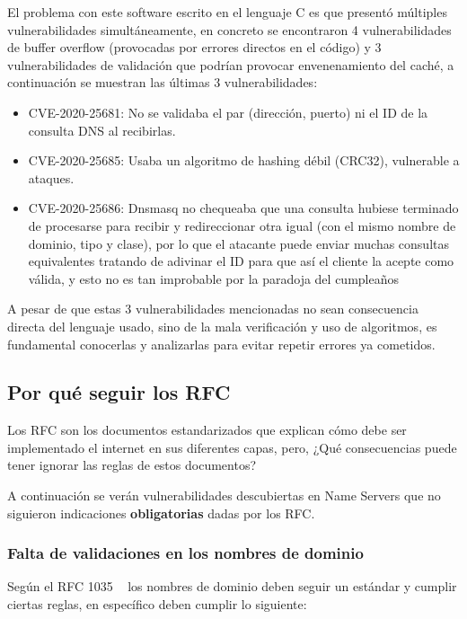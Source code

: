 El problema con este software escrito en el lenguaje C es que presentó múltiples vulnerabilidades simultáneamente, en concreto se encontraron 4 
vulnerabilidades de buffer overflow (provocadas por errores directos en el código) y 3 vulnerabilidades de validación que podrían provocar 
envenenamiento del caché, a continuación se muestran las últimas 3 vulnerabilidades:

\begin{itemize}
\item CVE-2020-25681: No se validaba el par (dirección, puerto) ni el ID de la consulta DNS al recibirlas.
\item CVE-2020-25685: Usaba un algoritmo de hashing débil (CRC32), vulnerable a ataques.
\item CVE-2020-25686: Dnsmasq no chequeaba que una consulta hubiese terminado de procesarse para recibir y redireccionar otra igual 
(con el mismo nombre de dominio, tipo y clase), por lo que el atacante puede enviar muchas consultas equivalentes tratando de adivinar el ID 
para que así el cliente la acepte como válida, y esto no es tan improbable por la paradoja del cumpleaños ~\cite{BirthdayAttacks}
\end{itemize}


A pesar de que estas 3 vulnerabilidades mencionadas no sean consecuencia directa del lenguaje usado, sino de la mala verificación y uso de 
algoritmos, es fundamental conocerlas y analizarlas para evitar repetir errores ya cometidos.

\subsection{Por qué seguir los RFC}

Los RFC son los documentos estandarizados que explican cómo debe ser implementado el internet en sus diferentes capas, pero, 
¿Qué consecuencias puede tener ignorar las reglas de estos documentos?

A continuación se verán vulnerabilidades descubiertas en Name Servers que no siguieron indicaciones \textbf{obligatorias} dadas por los RFC.

\subsubsection{Falta de validaciones en los nombres de dominio}

Según el RFC 1035 ~\cite{RFC1035} los nombres de dominio deben seguir un estándar y cumplir ciertas reglas, en específico deben cumplir lo siguiente:

